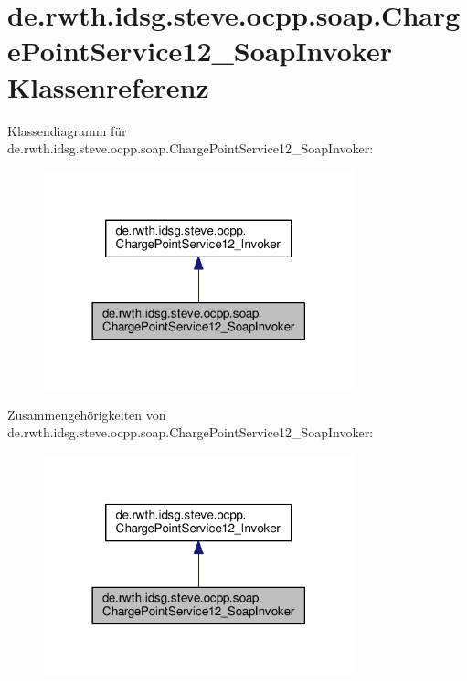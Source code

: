\hypertarget{classde_1_1rwth_1_1idsg_1_1steve_1_1ocpp_1_1soap_1_1_charge_point_service12___soap_invoker}{\section{de.\-rwth.\-idsg.\-steve.\-ocpp.\-soap.\-Charge\-Point\-Service12\-\_\-\-Soap\-Invoker Klassenreferenz}
\label{classde_1_1rwth_1_1idsg_1_1steve_1_1ocpp_1_1soap_1_1_charge_point_service12___soap_invoker}
}


Klassendiagramm für de.\-rwth.\-idsg.\-steve.\-ocpp.\-soap.\-Charge\-Point\-Service12\-\_\-\-Soap\-Invoker\-:\nopagebreak
\begin{figure}[H]
\begin{center}
\leavevmode
\includegraphics[width=254pt]{classde_1_1rwth_1_1idsg_1_1steve_1_1ocpp_1_1soap_1_1_charge_point_service12___soap_invoker__inherit__graph}
\end{center}
\end{figure}


Zusammengehörigkeiten von de.\-rwth.\-idsg.\-steve.\-ocpp.\-soap.\-Charge\-Point\-Service12\-\_\-\-Soap\-Invoker\-:\nopagebreak
\begin{figure}[H]
\begin{center}
\leavevmode
\includegraphics[width=254pt]{classde_1_1rwth_1_1idsg_1_1steve_1_1ocpp_1_1soap_1_1_charge_point_service12___soap_invoker__coll__graph}
\end{center}
\end{figure}
